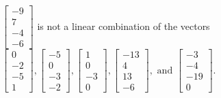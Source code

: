 \begin{exercise}
\begin{exerciseStatement}
  \end{exerciseStatement}
  \begin{exerciseAnswer}
   \(\left[\begin{array}{c}
-9 \\
7 \\
-4 \\
-6
\end{array}\right]\) 
  	 is not  
	a linear combination of the vectors \(\left[\begin{array}{c}
0 \\
-2 \\
-5 \\
1
\end{array}\right] , \left[\begin{array}{c}
-5 \\
0 \\
-3 \\
-2
\end{array}\right] , \left[\begin{array}{c}
1 \\
0 \\
-3 \\
0
\end{array}\right] , \left[\begin{array}{c}
-13 \\
4 \\
13 \\
-6
\end{array}\right] , \text{ and } \left[\begin{array}{c}
-3 \\
-4 \\
-19 \\
0
\end{array}\right]\).

	
  


  \end{exerciseAnswer}
\end{exercise}